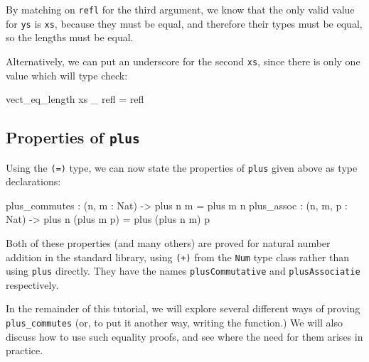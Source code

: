 \noindent
By matching on \texttt{refl} for the third argument, we know that the only
valid value for \texttt{ys} is \texttt{xs}, because they must be equal, and
therefore their types must be equal, so the lengths must be equal.

Alternatively, we can put an underscore for the second \texttt{xs}, since there
is only one value which will type check:

\begin{code}
vect_eq_length xs _ refl = refl
\end{code}

\subsection{Properties of \texttt{plus}}

Using the \texttt{(=)} type, we can now state the properties of \texttt{plus}
given above as \Idris{} type declarations:

\begin{code}
plus_commutes : (n, m : Nat) -> plus n m = plus m n
plus_assoc : (n, m, p : Nat) -> plus n (plus m p) = plus (plus n m) p
\end{code}

\noindent
Both of these properties (and many others)
are proved for natural number addition in the \Idris{}
standard library, using \texttt{(+)} from the \texttt{Num} type class rather
than using \texttt{plus} directly. They have the names \texttt{plusCommutative}
and \texttt{plusAssociatie} respectively.

In the remainder of this tutorial, we will explore several different ways
of proving \texttt{plus\_commutes} (or, to put it another way, writing the
function.) We will also discuss how to use such equality proofs, and see where
the need for them arises in practice.
